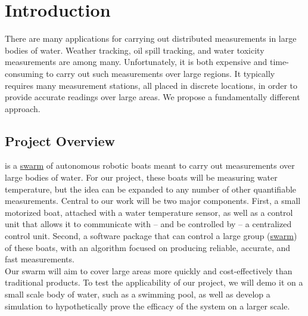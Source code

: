 \documentclass[11pt]{article}
\begin{document}
\newpage

\section{Introduction}

There are many applications for carrying out distributed measurements in large bodies of water. Weather tracking, oil spill tracking, and water toxicity measurements are among many. Unfortunately, it is both expensive and time-consuming to carry out such measurements over large regions. It typically requires many measurement stations, all placed in discrete locations, in order to provide accurate readings over large areas. We propose a fundamentally different approach.

\subsection{Project Overview}

\PROJECTNAME \space is a \hyperref[sec:definitions]{swarm} of autonomous robotic boats meant to carry out measurements over large bodies of water. For our project, these boats will be measuring water temperature, but the idea can be expanded to any number of other quantifiable measurements. Central to our work will be two major components. First, a small motorized boat, attached with a water temperature sensor, as well as a control unit that allows it to communicate with – and be controlled by – a centralized control unit. Second, a software package that can control a large group (\hyperref[sec:definitions]{swarm}) of these boats, with an algorithm focused on producing reliable, accurate, and fast measurements.\\

Our swarm will aim to cover large areas more quickly and cost-effectively than traditional products. To test the applicability of our project, we will demo it on a small scale body of water, such as a swimming pool, as well as develop a simulation to hypothetically prove the efficacy of the system on a larger scale.\\
\end{document}
